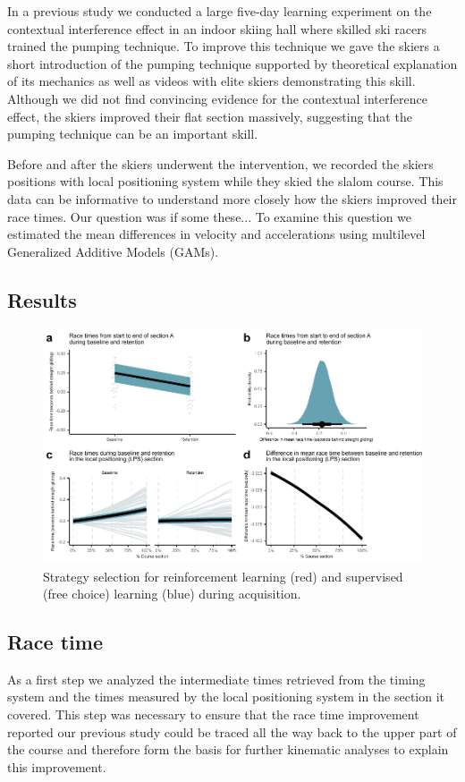 \documentclass{article}
\begin{document}
In a previous study we conducted a large five-day learning experiment on the contextual interference effect in an indoor skiing hall where skilled ski racers trained the pumping technique. To improve this technique we gave the skiers a short introduction of the pumping technique supported by theoretical explanation of its mechanics as well as videos with elite skiers demonstrating this skill. Although we did not find convincing evidence for the contextual interference effect, the skiers improved their flat section massively, suggesting that the pumping technique can be an important skill.

Before and after the skiers underwent the intervention, we recorded the skiers positions with local positioning system while they skied the slalom course. This data can be informative to understand more closely how the skiers improved their race times. Our question was if some these... To examine this question we estimated the mean differences in velocity and accelerations using multilevel Generalized Additive Models (GAMs).

\subsection{Results}


\begin{figure}[H]
\centering
\includegraphics{figurer/figure_racetime.pdf}
\caption{Strategy selection for reinforcement learning (red) and supervised (free choice) learning (blue) during acquisition.}\label{fig: choice_estimated}
\end{figure}


\subsection{Race time}
As a first step we analyzed the intermediate times retrieved from the timing system and the times measured by the local positioning system in the section it covered. This step was necessary to ensure that the race time improvement reported our previous study could be traced all the way back to the upper part of the course and therefore form the basis for further kinematic analyses to explain this improvement. 
\end{document}
